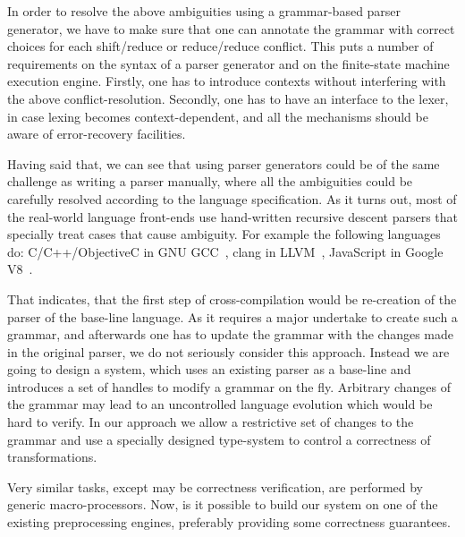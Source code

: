 \noindent
In order to resolve the above ambiguities using a grammar-based parser generator,
we have to make sure that one can annotate the grammar with correct choices for
each shift/reduce or reduce/reduce conflict. This puts a number of requirements
on the syntax of a parser generator and on the finite-state machine execution
engine.  Firstly, one has to introduce contexts without interfering with the
above conflict-resolution.  Secondly, one has to have an interface to the lexer,
in case lexing becomes context-dependent, and all the mechanisms should be aware 
of error-recovery facilities.

Having said that, we can see that using parser generators could be of
the same challenge as writing a parser manually, where all the
ambiguities could be carefully resolved according to the language
specification.  As it turns out, most of the real-world language
front-ends use hand-written recursive descent parsers that specially
treat cases that cause ambiguity.  For example the following languages do:
C/C++/ObjectiveC in GNU GCC~\cite{gcc}, clang in LLVM~\cite{clang}, 
JavaScript in Google V8~\cite{v8}.

That indicates, that the first step of cross-compilation
would be re-creation of the parser of the base-line language.
As it requires a major undertake to create such a grammar, and
afterwards one has to update the grammar with the changes made 
in the original parser, we do not seriously consider this approach.
Instead we are going to design a system, which uses an existing
parser as a base-line and introduces a set of handles to modify
a grammar on the fly.  Arbitrary changes of the grammar may lead
to an uncontrolled language evolution which would be hard to verify.
In our approach we allow a restrictive set of changes to the grammar
and use a specially designed type-system to control a correctness
of transformations.

Very similar tasks, except may be correctness verification, are
performed by generic macro-processors.  Now, is it possible to
build our system on one of the existing preprocessing engines,
preferably providing some correctness guarantees.

